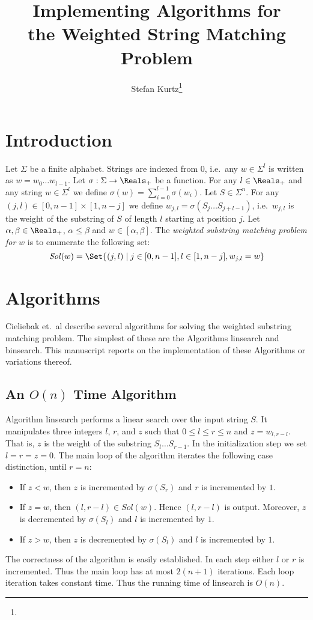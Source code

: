 \documentclass[12pt]{article}
\author{Stefan Kurtz\thanks{\SKaffiliation}}
\title{\textbf{Implementing Algorithms for}\\
       \textbf{the Weighted String Matching Problem}}
\newcommand{\Linsearch}[0]{{\small \textsf{linsearch}}\xspace}
\newcommand{\Binsearch}[0]{{\small \textsf{binsearch}}\xspace}
\newcommand{\Weight}[0]{w}
\newcommand{\Sol}[1]{\mathit{Sol}(\Weight)}
\newcommand{\WSMP}{weighted substring matching problem\xspace}
\begin{document}
\maketitle
\section{Introduction}
Let \(\Sigma\) be a finite alphabet. Strings are indexed from \(0\), 
i.e.\ any \(w\in\Sigma^{l}\) is written as \(w=w_{0}\ldots w_{l-1}\).
Let \(\sigma:\Sigma\to\Reals_{+}\) be a function.
For any \(l\in\Reals_{+}\) and any
string \(w\in\Sigma^{l}\) we define \(\sigma(w)=\sum_{i=0}^{l-1}\sigma(w_{i})\).
Let \(S\in\Sigma^{n}\). For any \((j,l)\in[0,n-1]\times[1,n-j]\)
we define \(\Weight_{j,l}=\sigma(S_{j}\ldots S_{j+l-1})\), i.e.\
\(\Weight_{j,l}\) is the weight of the substring of \(S\) of length \(l\) 
starting at position \(j\). Let \(\alpha,\beta\in\Reals_{+}\), 
\(\alpha\leq\beta\) and \(\Weight\in[\alpha,\beta]\). The 
\emph{\WSMP for} \(\Weight\) is to enumerate the 
following set:
\[\Sol{\Weight}=\Set{(j,l)\mid j\in[0,n-1], l\in[1,n-j],\Weight_{j,l}=\Weight}\]

\section{Algorithms}
Cieliebak et.\ al \cite{CIE:ERL:LIP:STO:WEL:2001} describe several algorithms
for solving the \WSMP. The simplest of these
are the Algorithms \Linsearch and \Binsearch. This manuscript reports
on the implementation of these Algorithms or variations thereof.

\subsection{An $O(n)$ Time Algorithm}
Algorithm \Linsearch performs a linear search over the input string \(S\).
It manipulates three integers \(l\), \(r\), and \(z\) such that 
\(0\leq l\leq r\leq n\)  and \(z=\Weight_{l,r-l}\). That is, \(z\) is the
weight of the substring \(S_{l}\ldots S_{r-1}\). In the initialization step
we set \(l=r=z=0\). The main loop of the algorithm iterates
the following case distinction, until \(r=n\):

\begin{itemize}
\item
If \(z<\Weight\), then \(z\) is incremented
by \(\sigma(S_{r})\) and \(r\) is incremented by \(1\). 
\item
If \(z=\Weight\), then \((l,r-l)\in\Sol{\Weight}\). Hence \((l,r-l)\) is output.
Moreover, \(z\) is decremented by \(\sigma(S_{l})\) and \(l\) is incremented 
by \(1\). 
\item
If \(z>\Weight\), then \(z\) is decremented by \(\sigma(S_{l})\) and \(l\) is 
incremented by \(1\). 
\end{itemize}
The correctness of the algorithm is easily established.
In each step either \(l\) or \(r\) is incremented. Thus the main loop has at
most \(2(n+1)\) iterations. Each loop iteration takes constant time. Thus 
the running time of \Linsearch is \(O(n)\).
\end{document}
